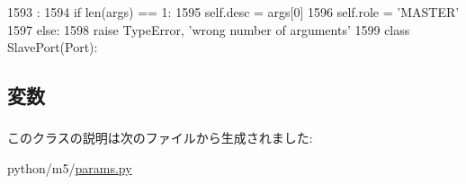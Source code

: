 \begin{DoxyCode}
1593                              :
1594         if len(args) == 1:
1595             self.desc = args[0]
1596             self.role = 'MASTER'
1597         else:
1598             raise TypeError, 'wrong number of arguments'
1599 
class SlavePort(Port):
\end{DoxyCode}


\subsection{変数}
\hypertarget{classm5_1_1params_1_1MasterPort_aafc566bb08a9f46485e7238669581c2b}{
\subsubsection[{desc}]{}}
\label{classm5_1_1params_1_1MasterPort_aafc566bb08a9f46485e7238669581c2b}
\hypertarget{classm5_1_1params_1_1MasterPort_a4e0cdb878325d53ad79a74504bf97a96}{
\subsubsection[{role}]{}}
\label{classm5_1_1params_1_1MasterPort_a4e0cdb878325d53ad79a74504bf97a96}


このクラスの説明は次のファイルから生成されました:\begin{DoxyCompactItemize}
\item 
python/m5/\hyperlink{params_8py}{params.py}\end{DoxyCompactItemize}
